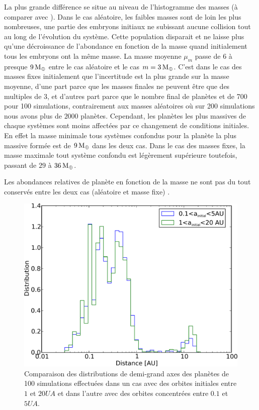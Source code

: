 La plus grande différence se situe au niveau de l'histogramme des masses  (à comparer avec
). Dans le cas aléatoire, les faibles masses sont de loin les plus nombreuses, une partie des embryons
initiaux ne subissant aucune collision tout au long de l'évolution du système. Cette population disparait et ne laisse plus
qu'une décroissance de l'abondance en fonction de la masse quand initialement tous les embryons ont la même masse. La masse
moyenne $\mu_m$ passe de $6$ à presque $9\mathrm{\thinspace M_\oplus}$ entre le cas aléatoire et le cas $m=3\mathrm{\thinspace M_\oplus}$. C'est dans le cas des
masses fixes initialement que l'incertitude est la plus grande sur la masse moyenne, d'une part parce que les masses finales ne
peuvent être que des multiples de 3, et d'autres part parce que le nombre final de planètes et de 700 pour 100 simulations,
contrairement aux masses aléatoires où sur 200 simulations nous avons plus de $2000$ planètes. Cependant, les planètes les plus
massives de chaque systèmes sont moins affectées par ce changement de conditions initiales. En effet la masse minimale tous
systèmes confondus pour la planète la plus massive formée est de $9\mathrm{\thinspace M_\oplus}$ dans les deux cas. Dans le cas des masses fixes, la
masse maximale tout 
système confondu est légèrement supérieure toutefois, passant de $29$ à $36\mathrm{\thinspace M_\oplus}$. 

Les abondances relatives de planète en fonction de la masse ne sont pas du tout conservés entre les deux cas (aléatoire et masse fixe) .

\bigskip

\begin{figure}[htb]
\centering
\includegraphics[width=0.65\linewidth]{figure/HSE/a_influence.pdf}
\caption{Comparaison des distributions de demi-grand axes des planètes de 100 simulations effectuées dans un cas avec des orbites initiales entre $1$ et $20\unit{UA}$ et dans l'autre avec des orbites concentrées entre $0.1$ et $5\unit{UA}$.}\label{fig:HSE_a_influence}
\end{figure}

